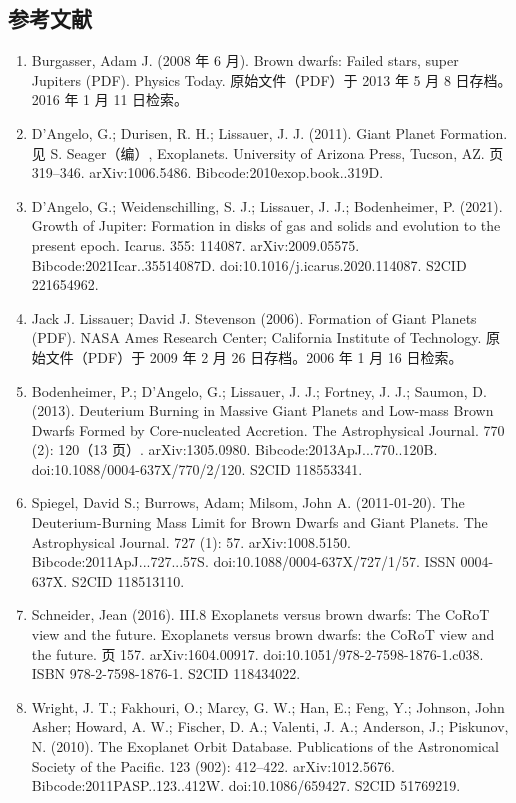 \subsection{参考文献}
\begin{enumerate}
\item Burgasser, Adam J. (2008 年 6 月). Brown dwarfs: Failed stars, super Jupiters (PDF). Physics Today. 原始文件（PDF）于 2013 年 5 月 8 日存档。2016 年 1 月 11 日检索。
\item D'Angelo, G.; Durisen, R. H.; Lissauer, J. J. (2011). Giant Planet Formation. 见 S. Seager（编）, Exoplanets. University of Arizona Press, Tucson, AZ. 页 319–346. arXiv:1006.5486. Bibcode:2010exop.book..319D.
\item D'Angelo, G.; Weidenschilling, S. J.; Lissauer, J. J.; Bodenheimer, P. (2021). Growth of Jupiter: Formation in disks of gas and solids and evolution to the present epoch. Icarus. 355: 114087. arXiv:2009.05575. Bibcode:2021Icar..35514087D. doi:10.1016/j.icarus.2020.114087. S2CID 221654962.
\item Jack J. Lissauer; David J. Stevenson (2006). Formation of Giant Planets (PDF). NASA Ames Research Center; California Institute of Technology. 原始文件（PDF）于 2009 年 2 月 26 日存档。2006 年 1 月 16 日检索。
\item Bodenheimer, P.; D'Angelo, G.; Lissauer, J. J.; Fortney, J. J.; Saumon, D. (2013). Deuterium Burning in Massive Giant Planets and Low-mass Brown Dwarfs Formed by Core-nucleated Accretion. The Astrophysical Journal. 770 (2): 120（13 页）. arXiv:1305.0980. Bibcode:2013ApJ...770..120B. doi:10.1088/0004-637X/770/2/120. S2CID 118553341.
\item Spiegel, David S.; Burrows, Adam; Milsom, John A. (2011-01-20). The Deuterium-Burning Mass Limit for Brown Dwarfs and Giant Planets. The Astrophysical Journal. 727 (1): 57. arXiv:1008.5150. Bibcode:2011ApJ...727...57S. doi:10.1088/0004-637X/727/1/57. ISSN 0004-637X. S2CID 118513110.
\item Schneider, Jean (2016). III.8 Exoplanets versus brown dwarfs: The CoRoT view and the future. Exoplanets versus brown dwarfs: the CoRoT view and the future. 页 157. arXiv:1604.00917. doi:10.1051/978-2-7598-1876-1.c038. ISBN 978-2-7598-1876-1. S2CID 118434022.
\item Wright, J. T.; Fakhouri, O.; Marcy, G. W.; Han, E.; Feng, Y.; Johnson, John Asher; Howard, A. W.; Fischer, D. A.; Valenti, J. A.; Anderson, J.; Piskunov, N. (2010). The Exoplanet Orbit Database. Publications of the Astronomical Society of the Pacific. 123 (902): 412–422. arXiv:1012.5676. Bibcode:2011PASP..123..412W. doi:10.1086/659427. S2CID 51769219.

\end{enumerate}
